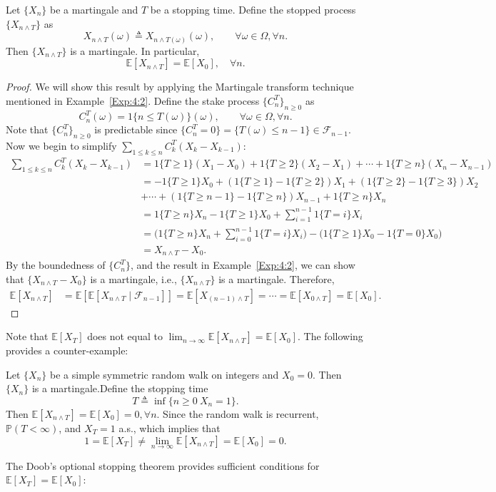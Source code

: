 \begin{theorem}\label{The:4:3}
Let $\{X_n\}$ be a martingale and $T$ be a stopping time.
Define the stopped process $\{X_{n\land T}\}$ as
\[
X_{n\land T}(\omega)\triangleq X_{n\land T(\omega)}(\omega),\qquad\forall\omega\in\Omega,\forall n.
\]
Then $\{X_{n\land T}\}$ is a martingale. In particular, 
\[
\mathbb{E}[X_{n\land T}]=\mathbb{E}[X_0],\quad\forall n.
\]
\end{theorem}
\begin{proof}
We will show this result by applying the Martingale transform technique mentioned in Example~\ref{Exp:4:2}.
Define the stake process $\{C_n^T\}_{n\ge0}$ as
\[
C_n^T(\omega) = 1\{n\le T(\omega)\}(\omega),\qquad\forall\omega\in\Omega,\forall n.
\]
Note that $\{C_n^T\}_{n\ge0}$ is predictable since $\{C_n^T=0\}=\{T(\omega)\le n-1\}\in\mathcal{F}_{n-1}$.
Now we begin to simplify $\sum_{1\le k\le n}C_k^T(X_k - X_{k-1})$:
\begin{align*}
\sum_{1\le k\le n}C_k^T(X_k - X_{k-1})
&=1\{T\ge1\}(X_1-X_0)+1\{T\ge2\}(X_2-X_1)+\cdots+1\{T\ge n\}(X_n - X_{n-1})\\
&=-1\{T\ge1\}X_0 + (1\{T\ge1\} - 1\{T\ge2\})X_1 + (1\{T\ge2\} - 1\{T\ge3\})X_2\\
&+\cdots+
(1\{T\ge n-1\} - 1\{T\ge n\})X_{n-1}+1\{T\ge n\}X_n\\
&=1\{T\ge n\}X_n-1\{T\ge1\}X_0 + \sum_{i=1}^{n-1}1\{T=i\}X_i\\
&=\bigg(
1\{T\ge n\}X_n+\sum_{i=0}^{n-1}1\{T=i\}X_i
\bigg)-\bigg(1\{T\ge1\}X_0-1\{T=0\}X_0\bigg)\\
&=X_{n\land T} - X_0.
\end{align*}
By the boundedness of $\{C_n^T\}$, and the result in Example~\ref{Exp:4:2},
we can show that $\{X_{n\land T} - X_0\}$ is a martingale, i.e., $\{X_{n\land T}\}$ is a martingale.
Therefore,
\begin{align*}
\mathbb{E}[X_{n\land T}]&=\mathbb{E}[\mathbb{E}[X_{n\land T}\mid\mathcal{F}_{n-1}]]
=\mathbb{E}[X_{(n-1)\land T}]=\cdots=\mathbb{E}[X_{0\land T}]=\mathbb{E}[X_0].
\end{align*}
\end{proof}

Note that $\mathbb{E}[X_T]$ does not equal to $\lim_{n\to\infty}\mathbb{E}[X_{n\land T}]=\mathbb{E}[X_0]$. The following provides a counter-example:
\begin{example}
Let $\{X_n\}$ be a simple symmetric random walk on integers and $X_0=0$.
Then $\{X_n\}$ is a martingale.Define the stopping time
\[
T\triangleq\inf\{n\ge0~X_n=1\}.
\]
Then $\mathbb{E}[X_{n\land T}]=\mathbb{E}[X_0]=0,\forall n$.
Since the random walk is recurrent, $\mathbb{P}(T<\infty)$, and $X_T=1$ a.s., which implies that
\[
1 = \mathbb{E}[X_T]\ne \lim_{n\to\infty}\mathbb{E}[X_{n\land T}]=\mathbb{E}[X_0]=0.
\]
\end{example}
The Doob's optional stopping theorem provides sufficient conditions for 
$\mathbb{E}[X_T]=\mathbb{E}[X_0]$:

